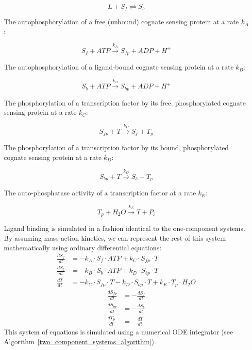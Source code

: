 \documentclass[12pt]{article}
\begin{document}
\begin{equation}
L + S_{f} \rightleftharpoons S_{b}
\end{equation}

\noindent The autophosphorylation of a free (unbound) cognate sensing protein at a rate \(k_A\):

\begin{equation}
S_{f} + ATP \overset{k_A}{\rightarrow} S_{fp} + ADP + H^+
\end{equation}

\noindent The autophosphorylation of a ligand-bound cognate sensing protein at a rate \(k_B\):

\begin{equation}
S_{b} + ATP \overset{k_B}{\rightarrow} S_{bp} + ADP + H^+
\end{equation}

\noindent The phosphorylation of a transcription factor by its free, phosphorylated cognate sensing protein at a rate \(k_C\):

\begin{equation}
S_{fp} + T \overset{k_C}{\rightarrow} S_{f} + T_{p}
\end{equation}

\noindent The phosphorylation of a transcription factor by its bound, phosphorylated cognate sensing protein at a rate \(k_D\):

\begin{equation}
S_{bp} + T \overset{k_D}{\rightarrow} S_{b} + T_{p}
\end{equation}

\noindent The auto-phosphatase activity of a transcription factor at a rate \(k_E\):

\begin{equation}
T_{p} + H_2O \overset{k_E}{\rightarrow} T + P_i
\end{equation}

\noindent Ligand binding is simulated in a fashion identical to the one-component systems. By assuming mass-action kinetics, we can represent the rest of this system mathematically using ordinary differential equations:
\begin{align}
    \frac{dS_f}{dt} &= -k_A \cdot S_f \cdot ATP + k_C \cdot S_{fp} \cdot T \\
    \frac{dS_b}{dt} &= -k_B \cdot S_b \cdot ATP + k_D \cdot S_{bp} \cdot T \\
    \frac{dT}{dt} &= -k_C \cdot S_{fp} \cdot T - k_D \cdot S_{bp} \cdot T + k_E \cdot T_p \cdot H_2O
\end{align}
\begin{align}
    \frac{dS_{fp}}{dt} &= -\frac{dS_f}{dt} \\
    \frac{dS_{bp}}{dt} &= -\frac{dS_b}{dt} \\
    \frac{dT_p}{dt} &= -\frac{dT}{dt}
\end{align}
\noindent This system of equations is simulated using a numerical ODE integrator (see Algorithm~\ref{two_component_systems_algorithm}).
\end{document}
